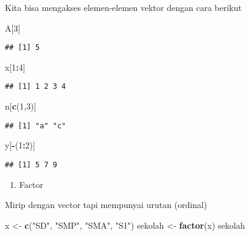 \documentclass[
]{book}
\newenvironment{Shaded}{\begin{snugshade}}{\end{snugshade}}
\newcommand{\DecValTok}[1]{\textcolor[rgb]{0.00,0.00,0.81}{#1}}
\newcommand{\KeywordTok}[1]{\textcolor[rgb]{0.13,0.29,0.53}{\textbf{#1}}}
\newcommand{\NormalTok}[1]{#1}
\newcommand{\OperatorTok}[1]{\textcolor[rgb]{0.81,0.36,0.00}{\textbf{#1}}}
\newcommand{\StringTok}[1]{\textcolor[rgb]{0.31,0.60,0.02}{#1}}
\providecommand{\tightlist}{%
  \setlength{\itemsep}{0pt}\setlength{\parskip}{0pt}}
\begin{document}
Kita bisa mengakses elemen-elemen vektor dengan cara berikut

\begin{Shaded}
\begin{Highlighting}[]
\NormalTok{A[}\DecValTok{3}\NormalTok{]}
\end{Highlighting}
\end{Shaded}

\begin{verbatim}
## [1] 5
\end{verbatim}

\begin{Shaded}
\begin{Highlighting}[]
\NormalTok{x[}\DecValTok{1}\OperatorTok{:}\DecValTok{4}\NormalTok{]}
\end{Highlighting}
\end{Shaded}

\begin{verbatim}
## [1] 1 2 3 4
\end{verbatim}

\begin{Shaded}
\begin{Highlighting}[]
\NormalTok{n[}\KeywordTok{c}\NormalTok{(}\DecValTok{1}\NormalTok{,}\DecValTok{3}\NormalTok{)]}
\end{Highlighting}
\end{Shaded}

\begin{verbatim}
## [1] "a" "c"
\end{verbatim}

\begin{Shaded}
\begin{Highlighting}[]
\NormalTok{y[}\OperatorTok{{-}}\NormalTok{(}\DecValTok{1}\OperatorTok{:}\DecValTok{2}\NormalTok{)]}
\end{Highlighting}
\end{Shaded}

\begin{verbatim}
## [1] 5 7 9
\end{verbatim}

\begin{enumerate}
\def\labelenumi{\arabic{enumi}.}
\setcounter{enumi}{1}
\tightlist
\item
  Factor
\end{enumerate}

Mirip dengan vector tapi mempunyai urutan (ordinal)

\begin{Shaded}
\begin{Highlighting}[]
\NormalTok{x \textless{}{-}}\StringTok{ }\KeywordTok{c}\NormalTok{(}\StringTok{"SD"}\NormalTok{, }\StringTok{"SMP"}\NormalTok{, }\StringTok{"SMA"}\NormalTok{, }\StringTok{"S1"}\NormalTok{)}
\NormalTok{sekolah \textless{}{-}}\StringTok{ }\KeywordTok{factor}\NormalTok{(x)}
\NormalTok{sekolah}
\end{Highlighting}
\end{Shaded}
\end{document}
